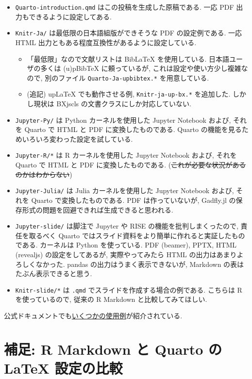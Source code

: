 \documentclass[
  letterpaper,
  DIV=11,
  pandoc,
  ja=standard,
  jafont=noto-otf]{bxjsarticle}
\providecommand{\tightlist}{%
  \setlength{\itemsep}{0pt}\setlength{\parskip}{0pt}}
\begin{document}
\begin{itemize}
\tightlist
\item
  \texttt{Quarto-introduction.qmd} はこの投稿を生成した原稿である. 一応
  PDF 出力もできるように設定してある.
\item
  \texttt{Knitr-Ja/} は最低限の日本語組版ができそうな PDF
  の設定例である. 一応 HTML
  出力ともある程度互換性があるように設定している.

  \begin{itemize}
  \tightlist
  \item
    「最低限」なので文献リストは BibLaTeX を使用している.
    日本語ユーザの多くは (u)pBibTeX に頼っているが,
    これは設定や使い方少し複雑なので, 別のファイル
    \texttt{Quarto-Ja-upbibtex.*} を用意している.
  \item
    (追記) upLaTeX でも動作させる例, \texttt{Knitr-ja-up-bx.*}
    を追加した. しかし現状は BXjscls の文書クラスにしか対応していない.
  \end{itemize}
\item
  \texttt{Jupyter-Py/} は Python カーネルを使用した Jupyter Notebook
  および, それを Quarto で HTML と PDF に変換したものである. Quarto
  の機能を見るためいろいろ変わった設定を試している.
\item
  \texttt{Jupyter-R/*} は R カーネルを使用した Jupyter Notebook および,
  それを Quarto で HTML と PDF に変換したものである.
  (\sout{これが必要な状況があるのかはわからない})
\item
  \texttt{Jupyter-Julia/} は Julia カーネルを使用した Jupyter Notebook
  および, それを Quarto で変換したものである. PDF は作っていないが,
  Gadfly.jl の保存形式の問題を回避できれば生成できると思われる.
\item
  \texttt{Jupyter-slide/} は脚注で Jupyter や RISE
  の機能を批判しまくったので, 責任を取るべく Quarto
  ではスライド資料をより簡単に作れると実証したものである. カーネルは
  Python を使っている. PDF (beamer), PPTX, HTML (revealjs)
  の設定をしてあるが, 実際やってみたら HTML
  の出力はあまりよろしくなかった. pandas の出力はうまく表示できないが,
  Markdown の表はたぶん表示できると思う.
\item
  \texttt{Knitr-slide/*} は \texttt{.qmd}
  でスライドを作成する場合の例である. こちらは R を使っているので,
  従来の R Markdown と比較してみてほしい.
\end{itemize}

公式ドキュメントでも\href{https://quarto.org/docs/gallery/}{いくつかの使用例}が紹介されている.

\hypertarget{ux88dcux8db3-r-markdown-ux3068-quarto-ux306e-latex-ux8a2dux5b9aux306eux6bd4ux8f03}{%
\section{補足: R Markdown と Quarto の LaTeX
設定の比較}\label{ux88dcux8db3-r-markdown-ux3068-quarto-ux306e-latex-ux8a2dux5b9aux306eux6bd4ux8f03}}
\end{document}
